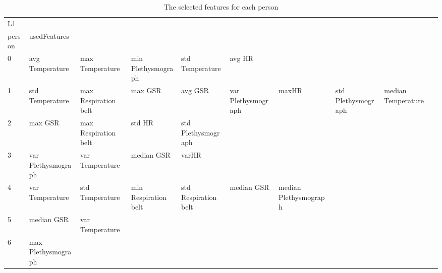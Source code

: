 \begin{landscape}
\begin{table}[]
\centering
\caption{The selected features for each person}
\begin{tabular}{l|llllllll}
L1       &                         &                         &                         &                         &                         &                       &                         &                         &                         &         \\
person   & usedFeatures            &                         &                         &                         &                         &                       &                         &                         &                         &         \\
0        & avg Temperature         & max Temperature         & min Plethysmograph      & std Temperature         & avg HR                  &                       &                         &                         &                         &         \\
1        & std Temperature         & max Respiration belt    & max GSR                 & avg GSR                 & var Plethysmograph      & maxHR                 & std Plethysmograph      & median Temperature      &                         &         \\
2        & max GSR                 & max Respiration belt    & std HR                  & std Plethysmograph      &                         &                       &                         &                         &                         &         \\
3        & var Plethysmograph      & var Temperature         & median GSR              & varHR                   &                         &                       &                         &                         &                         &         \\
4        & var Temperature         & std Temperature         & min Respiration belt    & std Respiration belt    & median GSR              & median Plethysmograph &                         &                         &                         &         \\
5        & median GSR              & var Temperature         &                         &                         &                         &                       &                         &                         &                         &         \\
6        & max Plethysmograph      &                         &                         &                         &                         &                       &                         &                         &                         &         \\

\end{tabular}
\end{table}
\end{landscape}
